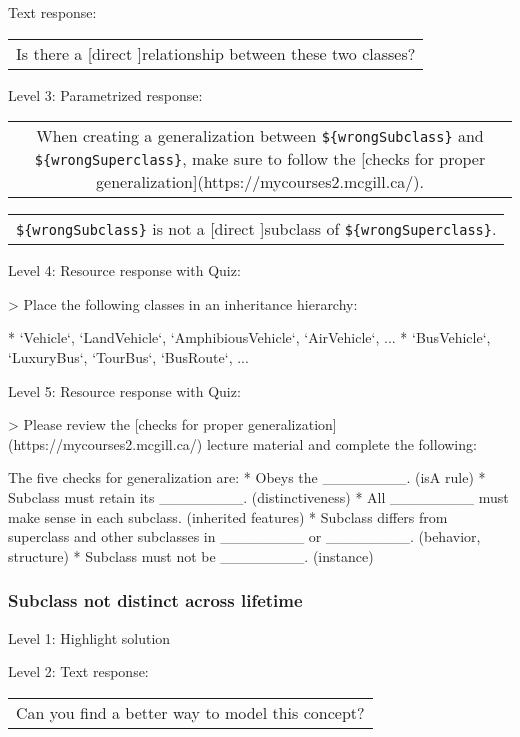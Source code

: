 Text response: \medskip

\begin{tabular}{|c}
Is there a [direct ]relationship between these two classes?
\end{tabular} \medskip

\noindent Level 3: Parametrized response: \medskip

\begin{tabular}{|c}
When creating a generalization between \verb|${wrongSubclass}| and \verb|${wrongSuperclass}|, make sure to follow the [checks for proper generalization](https://mycourses2.mcgill.ca/).
\end{tabular} \medskip

\begin{tabular}{|c}
\verb|${wrongSubclass}| is not a [direct ]subclass of \verb|${wrongSuperclass}|.
\end{tabular} \medskip

\noindent Level 4: Resource response with Quiz:

> Place the following classes in an inheritance hierarchy:

* `Vehicle`, `LandVehicle`, `AmphibiousVehicle`, `AirVehicle`, ...
* `BusVehicle`, `LuxuryBus`, `TourBus`, `BusRoute`, ...

\noindent Level 5: Resource response with Quiz:

> Please review the [checks for proper generalization](https://mycourses2.mcgill.ca/) lecture material
and complete the following:

The five checks for generalization are:
* Obeys the ________. (isA rule)
* Subclass must retain its ________. (distinctiveness)
* All ________ must make sense in each subclass. (inherited features)
* Subclass differs from superclass and other subclasses in ________ or ________. 
(behavior, structure)
* Subclass must not be ________. (instance)


\subsubsection{Subclass not distinct across lifetime}

\noindent Level 1: Highlight solution \medskip

\noindent Level 2: Text response: \medskip

\begin{tabular}{|c}
Can you find a better way to model this concept?
\end{tabular} \medskip

